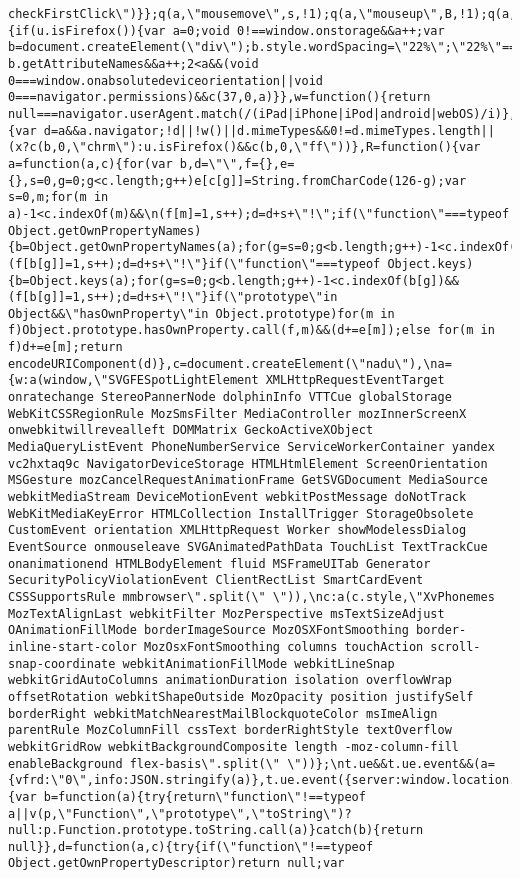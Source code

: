 \documentclass[
]{article}
\begin{document}
\begin{verbatim}
checkFirstClick\")}};q(a,\"mousemove\",s,!1);q(a,\"mouseup\",B,!1);q(a,\"mousedown\",p,!1);q(a,\"click\",t,!1);q(a,\"click\",g,!1)},O=function(){if(u.isFirefox()){var a=0;void 0!==window.onstorage&&a++;var b=document.createElement(\"div\");b.style.wordSpacing=\"22%\";\"22%\"===b.style.wordSpacing&&a++;\"function\"===\ntypeof b.getAttributeNames&&a++;2<a&&(void 0===window.onabsolutedeviceorientation||void 0===navigator.permissions)&&c(37,0,a)}},w=function(){return null===navigator.userAgent.match(/(iPad|iPhone|iPod|android|webOS)/i)},G=function(a,b){var d=a&&a.navigator;!d||!w()||d.mimeTypes&&0!=d.mimeTypes.length||(x?c(b,0,\"chrm\"):u.isFirefox()&&c(b,0,\"ff\"))},R=function(){var a=function(a,c){for(var b,d=\"\",f={},e={},s=0,g=0;g<c.length;g++)e[c[g]]=String.fromCharCode(126-g);var s=0,m;for(m in a)-1<c.indexOf(m)&&\n(f[m]=1,s++);d=d+s+\"!\";if(\"function\"===typeof Object.getOwnPropertyNames){b=Object.getOwnPropertyNames(a);for(g=s=0;g<b.length;g++)-1<c.indexOf(b[g])&&(f[b[g]]=1,s++);d=d+s+\"!\"}if(\"function\"===typeof Object.keys){b=Object.keys(a);for(g=s=0;g<b.length;g++)-1<c.indexOf(b[g])&&(f[b[g]]=1,s++);d=d+s+\"!\"}if(\"prototype\"in Object&&\"hasOwnProperty\"in Object.prototype)for(m in f)Object.prototype.hasOwnProperty.call(f,m)&&(d+=e[m]);else for(m in f)d+=e[m];return encodeURIComponent(d)},c=document.createElement(\"nadu\"),\na={w:a(window,\"SVGFESpotLightElement XMLHttpRequestEventTarget onratechange StereoPannerNode dolphinInfo VTTCue globalStorage WebKitCSSRegionRule MozSmsFilter MediaController mozInnerScreenX onwebkitwillrevealleft DOMMatrix GeckoActiveXObject MediaQueryListEvent PhoneNumberService ServiceWorkerContainer yandex vc2hxtaq9c NavigatorDeviceStorage HTMLHtmlElement ScreenOrientation MSGesture mozCancelRequestAnimationFrame GetSVGDocument MediaSource webkitMediaStream DeviceMotionEvent webkitPostMessage doNotTrack WebKitMediaKeyError HTMLCollection InstallTrigger StorageObsolete CustomEvent orientation XMLHttpRequest Worker showModelessDialog EventSource onmouseleave SVGAnimatedPathData TouchList TextTrackCue onanimationend HTMLBodyElement fluid MSFrameUITab Generator SecurityPolicyViolationEvent ClientRectList SmartCardEvent CSSSupportsRule mmbrowser\".split(\" \")),\nc:a(c.style,\"XvPhonemes MozTextAlignLast webkitFilter MozPerspective msTextSizeAdjust OAnimationFillMode borderImageSource MozOSXFontSmoothing border-inline-start-color MozOsxFontSmoothing columns touchAction scroll-snap-coordinate webkitAnimationFillMode webkitLineSnap webkitGridAutoColumns animationDuration isolation overflowWrap offsetRotation webkitShapeOutside MozOpacity position justifySelf borderRight webkitMatchNearestMailBlockquoteColor msImeAlign parentRule MozColumnFill cssText borderRightStyle textOverflow webkitGridRow webkitBackgroundComposite length -moz-column-fill enableBackground flex-basis\".split(\" \"))};\nt.ue&&t.ue.event&&(a={vfrd:\"0\",info:JSON.stringify(a)},t.ue.event({server:window.location.hostname,fmp:a},\"a9_tq\",\"a9_tq.FraudMetrics.3\"))},P=function(){var b=function(a){try{return\"function\"!==typeof a||v(p,\"Function\",\"prototype\",\"toString\")?null:p.Function.prototype.toString.call(a)}catch(b){return null}},d=function(a,c){try{if(\"function\"!==typeof Object.getOwnPropertyDescriptor)return null;var 
\end{verbatim}
\end{document}
